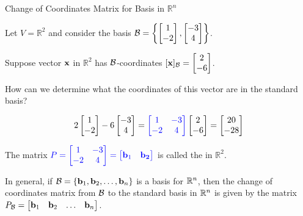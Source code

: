 \documentclass[xcolor=dvipsnames,aspectratio=169,t]{beamer}
\begin{document}
\begin{frame}{Change of Coordinates Matrix for Basis in $\mathbb{R}^n$}
  \smallskip

  Let $V = \mathbb{R}^2$  and consider the basis  $\mathcal{B} = \left\{ \begin{bmatrix} 1 \\ -2 \end{bmatrix} , \begin{bmatrix} -3 \\ 4 \end{bmatrix} \right\}$.
  \smallskip

  Suppose vector $\mathbf{x}$ in $\mathbb{R}^2$ has $\mathcal{B}$-coordinates
  $\lbrack \mathbf{x} \rbrack_{\mathcal{B}} = \begin{bmatrix} 2 \\ -6 \end{bmatrix}$.
  \smallskip
  
  \alert{How can we determine what the coordinates of this vector are in the standard basis?}

  \pause
  \[ 2 \begin{bmatrix} 1 \\ -2 \end{bmatrix} -6 \begin{bmatrix} -3 \\ 4 \end{bmatrix}  = \textcolor{blue}{\begin{bmatrix} 1 & -3 \\ -2 & 4 \end{bmatrix}} \begin{bmatrix} 2 \\ -6 \end{bmatrix} = \begin{bmatrix} 20 \\ -28 \end{bmatrix} \]

  \pause
  The matrix $\textcolor{blue}{P = \begin{bmatrix} 1 & -3 \\ -2 & 4 \end{bmatrix} = \begin{bmatrix} \mathbf{b}_1 & \mathbf{b_2} \end{bmatrix}}$ is called the  in $\mathbb{R}^2$.
  \medskip

  In general, if $\mathcal{B} = \left\{ \mathbf{b}_1 ,  \mathbf{b}_2, \ldots ,  \mathbf{b}_n \right\}$ is a basis for $\mathbb{R}^n$, then the \alert{change of coordinates matrix from $\mathcal{B}$ to the standard basis} in $\mathbb{R}^n$ is given by the matrix \alert{$P_{\mathcal{B}} = \begin{bmatrix} \mathbf{b}_1 &  \mathbf{b}_2 & \ldots & \mathbf{b}_n \end{bmatrix}$}.

\end{frame}
\end{document}
